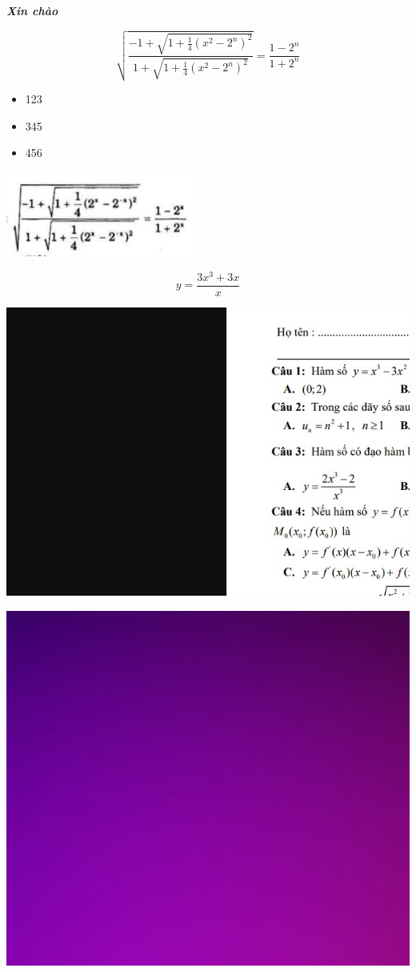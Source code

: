 \documentclass[fontsize=13pt,oneside,a4paper,openany]{vietkey.luanan.1.2}
\begin{document}
 


\VKnumRoman				%

\textit{\textbf{Xin chào}}

\[{\sqrt{\frac{-1+{\sqrt{1+{\frac{1}{4}}(x^{2}-2^{n})^{2}}}}{1+{\sqrt{1+{\frac{1}{4}}(x^{2}-2^{n})^{2}}}}}={\frac{1-2^{n}}{1+2^{n}}}}\]

\begin{itemize}
	\item 123
	\item 345
	\item 456
\end{itemize}

\includegraphics[scale=0.5]{image3_gLrwE}

\[y={\frac{3x^{3}+3x}{x}}\]

\includegraphics[scale=1]{RBqEh}

\includegraphics[scale=1]{geh6V}
\end{document}
